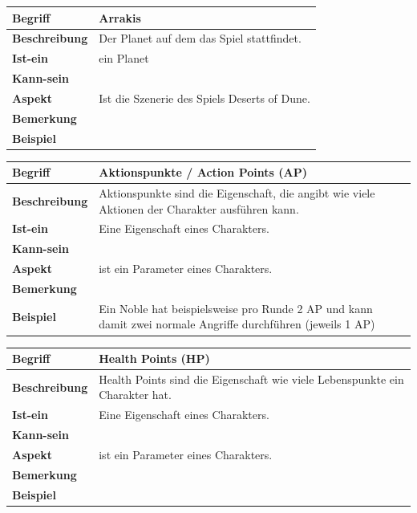 \documentclass[12pt]{article}
\begin{document}
\begin{tabularx}{\linewidth}{|l|X|}
\hline
\textbf{Begriff} & \textbf{Arrakis} \\
\hline
\textbf{Beschreibung} & Der Planet auf dem das Spiel stattfindet.\\
\hline
\textbf{Ist-ein} & ein Planet\\
\hline
\textbf{Kann-sein} & \\
\hline
\textbf{Aspekt} & Ist die Szenerie des Spiels Deserts of Dune. \\
\hline
\textbf{Bemerkung} & \\
\hline
\textbf{Beispiel} &  \\
\hline
\end{tabularx}

\begin{tabularx}{\linewidth}{|l|X|}
\hline
\textbf{Begriff} & \textbf{Aktionspunkte / Action Points (AP)} \\
\hline
\textbf{Beschreibung} & Aktionspunkte sind die Eigenschaft, die angibt wie viele Aktionen der Charakter ausführen kann. \\
\hline
\textbf{Ist-ein} & Eine Eigenschaft eines Charakters.\\
\hline
\textbf{Kann-sein} & \\
\hline
\textbf{Aspekt} & ist ein Parameter eines Charakters. \\
\hline
\textbf{Bemerkung} & \\
\hline
\textbf{Beispiel} & Ein Noble hat beispielsweise pro Runde 2 AP  und kann damit zwei normale Angriffe durchführen (jeweils 1 AP)\\
\hline
\end{tabularx}

\begin{tabularx}{\linewidth}{|l|X|}
\hline
\textbf{Begriff} & \textbf{Health Points (HP)} \\
\hline
\textbf{Beschreibung} & Health Points sind die Eigenschaft wie viele Lebenspunkte ein Charakter hat.\\
\hline
\textbf{Ist-ein} & Eine Eigenschaft eines Charakters.\\
\hline
\textbf{Kann-sein} & \\
\hline
\textbf{Aspekt} & ist ein Parameter eines Charakters. \\
\hline
\textbf{Bemerkung} & \\
\hline
\textbf{Beispiel} &  \\
\hline
\end{tabularx}
\end{document}
